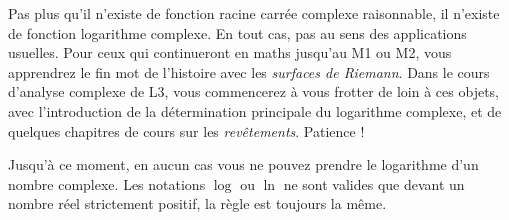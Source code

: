 \begin{mdframed}
Pas plus qu'il n'existe de fonction \og racine carrée complexe\fg{} raisonnable, il n'existe de fonction \og logarithme complexe\fg. En tout cas, pas au sens des applications usuelles. Pour ceux qui continueront en maths jusqu'au M1 ou M2, vous apprendrez le fin mot de l'histoire avec les \emph{surfaces de Riemann}. Dans le cours d'analyse complexe de L3, vous commencerez à vous frotter de loin à ces objets, avec l'introduction de la \og détermination principale du logarithme complexe\fg, et de quelques chapitres de cours sur les \emph{revêtements}. Patience !

Jusqu'à ce moment, en aucun cas vous ne pouvez prendre le \og logarithme\fg{} d'un nombre complexe. Les notations $\log$ ou $\ln$ ne sont valides que devant un nombre réel strictement positif, la règle est toujours la même.
\end{mdframed}

